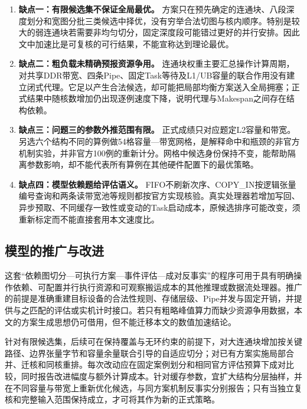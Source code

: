 \begin{enumerate}
\item \textbf{缺点一：有限候选集不保证全局最优。} 方案只在预先确定的连通块、八段深度划分和宽图分批三类候选中择优，没有穷举合法切图与核内顺序。特别是较大的弱连通块若需要非均匀切分，固定深度段可能错过更好的并行安排。因此文中加速比是可复核的可行结果，不能宣称达到理论最优。

\item \textbf{缺点二：粗负载未精确预报资源争用。} 连通块权重主要汇总操作计算周期，对共享DDR带宽、四条Pipe、固定Task等待及L1/UB容量的联合作用没有建立闭式代理。它足以产生合法候选，却可能把局部均衡方案送入全局拥塞；正式结果中随核数增加仍出现逐例速度下降，说明代理与Makespan之间存在结构依赖。

\item \textbf{缺点三：问题三的参数外推范围有限。} 正式成绩只对应题定L2容量和带宽。另选六个结构不同的算例做54格容量—带宽网格，是解释命中和瓶颈的非官方机制实验，并非官方100例的重新计分。网格中候选身份保持不变，能帮助隔离参数影响，却不能代表所有算例在其他硬件配置下的最优策略。

\item \textbf{缺点四：模型依赖题给评估语义。} FIFO不刷新次序、COPY\_IN按逻辑张量编号查询和两条读带宽池等规则都按官方实现核验。真实处理器若增加写回、异步预取、不同缓存一致性或变动的Task启动成本，原候选排序可能改变，须重新标定而不能直接套用本文速度比。
\end{enumerate}

\subsection{模型的推广与改进}

这套“依赖图切分—可执行方案—事件评估—成对反事实”的程序可用于具有明确操作依赖、可配置并行执行资源和可观察搬运成本的其他推理或数据流处理器。推广的前提是准确重建目标设备的合法性规则、存储层级、Pipe并发与固定开销，并提供与之匹配的评估或实机计时接口。若只有粗略峰值算力而缺少资源争用数据，本文的方案生成思想仍可借用，但不能迁移本文的数值加速结论。

针对有限候选集，后续可在保持覆盖与无环约束的前提下，对大连通块增加按关键路径、边界张量字节和容量余量联合引导的自适应切分；对已有方案实施局部合并、迁核和同核重排。每次改动应在固定案例划分和相同官方评估预算下成对比较，同时报告改进幅度与额外计算成本。针对缓存参数，宜扩大结构分层抽样，并在不同容量与带宽上重新优化候选，与同方案机制反事实分别报告；只有当独立复核和完整输入范围保持成立，才可将其作为新的正式策略。
